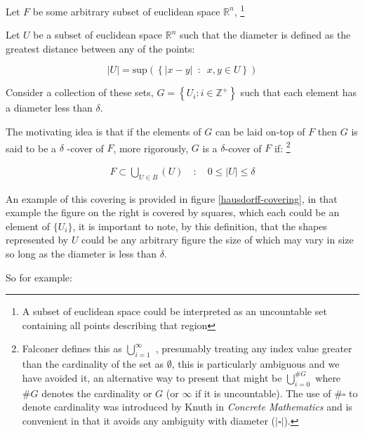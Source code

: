 \documentclass[a4paper,11pt,twoside]{article}
\begin{document}
Let \(F\) be some arbitrary subset of euclidean space \(\mathbb{R}^n\), \footnote{A subset of euclidean space could be interpreted as an uncountable set containing all points describing that region}

Let \(U\) be a subset of euclidean space \(\mathbb{R}^{n}\) such that the diameter is defined as the greatest distance between any of the points:

\[
\left\lvert U \right\rvert = \mathrm{sup}\left(\left\{ \left\lvert x- y \right\rvert \enspace : \enspace x,y \in U\right\}  \right)
\]

Consider a collection of these sets, \(G = \left\{U_i: i \in \mathbb{Z}^{+}\right\}\) such that each element has a diameter less than \(\delta\).


The motivating idea is that if the elements of \(G\) can be laid on-top of
\(F\) then \(G\) is said to be a \(\delta\) -cover of \(F\), more rigorously, \(G\) is a \(\delta\)-cover of \(F\) if: \footnote{Falconer defines this as \(\bigcup_{i=1}^{\infty}\) \cite[\S 2.1]{falconerFractalGeometryMathematical2003b},
presumably treating any index value greater than the cardinality of the set as \(\emptyset\), this is particularly ambiguous and we have avoided it, an alternative way to present that might be \(\bigcup^{\#G}_{i=0}\) where \(\#G\) denotes the cardinality or \(G\) (or \(\infty\) if it is uncountable). The use of \(\#\square\) to denote cardinality was introduced by Knuth in \emph{Concrete Mathematics} \cite{grahamConcreteMathematicsFoundation1994} and is convenient in that it avoids any ambiguity  with diameter (\(\left\lvert \square \right\rvert\)).}

\begin{align}
    F \subset \bigcup_{U\in B} \left( U \right) \quad :\quad 0 \leq \left\lvert U \right\rvert \leq \delta \label{eq:hausdorff-covering}
\end{align}



An example of this covering is provided in figure \ref{hausdorff-covering}, in that example the figure on the right is covered by squares, which each could be an element of \(\{U_{i}\}\), it is important to note, by this definition, that the shapes represented by \(U\) could be any arbitrary figure \cite[\S 2.1]{falconerFractalGeometryMathematical2003b} the size of which may vary in size so long as the diameter is less than \(\delta\).


So for example:
\end{document}
